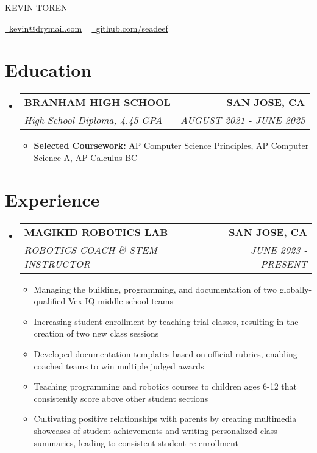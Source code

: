\documentclass[letterpaper,11pt]{article}
\makeatletter
\newcommand{\resumeItem}[1]{
  \item\small{
    {#1 \vspace{-3pt}}
  }
}
\newcommand{\resumeSubheading}[4]{
  \vspace{-3pt}\item
    \begin{tabular*}{1.0\textwidth}[t]{l@{\extracolsep{\fill}}r}
      \textbf{#1} & \textbf{\small #2} \\
      \textit{\small#3} & \textit{\small #4} \\
    \end{tabular*}\vspace{-7pt}
}
\newcommand{\resumeSubHeadingListStart}{\begin{itemize}[leftmargin=0.0in, label={}]}
\newcommand{\resumeSubHeadingListEnd}{\end{itemize}}
\newcommand{\resumeItemListStart}{\begin{itemize}}
\newcommand{\resumeItemListEnd}{\end{itemize}\vspace{0pt}}
\makeatother
\begin{document}
    \begin{center}
        {\Huge\scshape KEVIN TOREN} 
        
        \vspace{5 pt}
        \small
        \href{mailto:kevin@drymail.com}{\raisebox{-0.2\height}\faEnvelope\  \underline{kevin@drymail.com}} ~ 
        \href{https://github.com/seadeef}{\raisebox{-0.2\height}\faGithub\ \underline{github.com/seadeef}}
    \end{center}

\section{Education}
  \resumeSubHeadingListStart
  
    \resumeSubheading
    {BRANHAM HIGH SCHOOL}{SAN JOSE, CA}
    {High School Diploma, 4.45 GPA}{AUGUST 2021 - JUNE 2025}
        \resumeItemListStart
            \resumeItem{\textbf{Selected Coursework:}  AP Computer Science Principles, AP Computer Science A, AP Calculus BC}
            
        \resumeItemListEnd
        
  \resumeSubHeadingListEnd


\section{Experience}
    \resumeSubHeadingListStart
    
        \resumeSubheading
        {MAGIKID ROBOTICS LAB}{SAN JOSE, CA}
            {ROBOTICS COACH \& STEM INSTRUCTOR}{JUNE 2023 - PRESENT}
            \resumeItemListStart
                \resumeItem{Managing the building, programming, and documentation of two globally-qualified Vex IQ middle school teams}
                \resumeItem{Increasing student enrollment by teaching trial classes, resulting in the creation of two new class sessions}
                \resumeItem{Developed documentation templates based on official rubrics, enabling coached teams to win multiple judged awards}
                \resumeItem{Teaching programming and robotics courses to children ages 6-12 that consistently score above other student sections}
                \resumeItem{Cultivating positive relationships with parents by creating multimedia showcases of student achievements and writing personalized class summaries, leading to consistent student re-enrollment}
            \resumeItemListEnd
    \resumeSubHeadingListEnd
\end{document}
